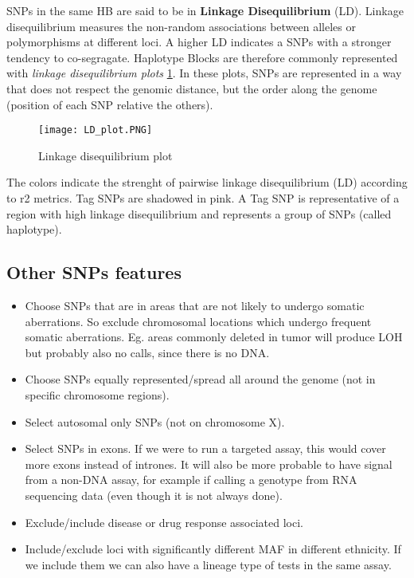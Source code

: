 SNPs in the same HB are said to be in \textbf{Linkage Disequilibrium} (LD). Linkage disequilibrium measures the non-random associations between alleles or polymorphisms at different loci. A higher LD indicates a SNPs with a stronger tendency to co-segragate.
Haplotype Blocks are therefore commonly represented with \emph{linkage disequilibrium plots} \ref{fig:LD_plot}. In these plots, SNPs are represented in a way that does not respect the genomic distance, but the order along the genome (position of each SNP relative the others). 

\begin{figure}
	\centering
	\texttt{[image: LD\_plot.PNG]}
	\caption{\label{fig:LD_plot}Linkage disequilibrium plot}
\end{figure}

The colors indicate the strenght of pairwise linkage disequilibrium (LD) according to r2 metrics. 
Tag SNPs are shadowed in pink. A Tag SNP is representative of a region with high linkage disequilibrium and represents a group of SNPs (called haplotype).


\subsection{Other SNPs features} 
\begin{itemize}
	\item Choose SNPs that are in areas that are not likely to undergo somatic aberrations. So exclude chromosomal locations which undergo frequent somatic aberrations. Eg. areas commonly deleted in tumor will produce LOH but probably also no calls, since there is no DNA. 
	\item Choose SNPs equally represented/spread all around the genome (not in specific chromosome regions).
	\item Select autosomal only SNPs (not on chromosome X).
	\item Select SNPs in exons. If we were to run a targeted assay, this would cover more exons instead of intrones. It will also be more probable to have signal from a non-DNA assay, for example if calling a genotype from RNA sequencing data (even though it is not always done).
	\item Exclude/include disease or drug response associated loci. 
	\item Include/exclude loci with significantly different MAF in different ethnicity. If we include them we can also have a lineage type of tests in the same assay. 
\end{itemize}


